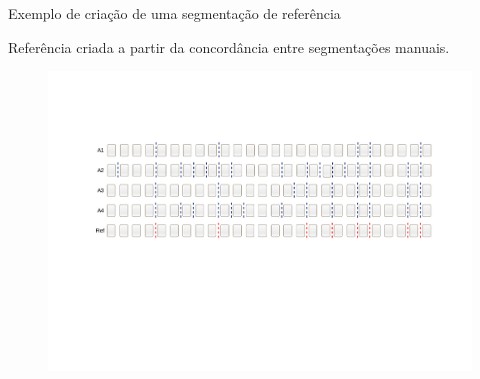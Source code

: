 \documentclass[xcolor=table]{beamer}
\begin{document}
\begin{frame}{Exemplo de criação de uma segmentação de referência}


  \begin{center}
	  Referência criada a partir da concordância entre segmentações manuais.
	\begin{figure}[h!]

	\includegraphics[trim={ 95 255 75 140 },clip,page=1,width=1\textwidth]{images/segmentacao-referencia.pdf}

	\end{figure}


\end{center}


\end{frame}






\end{document}
